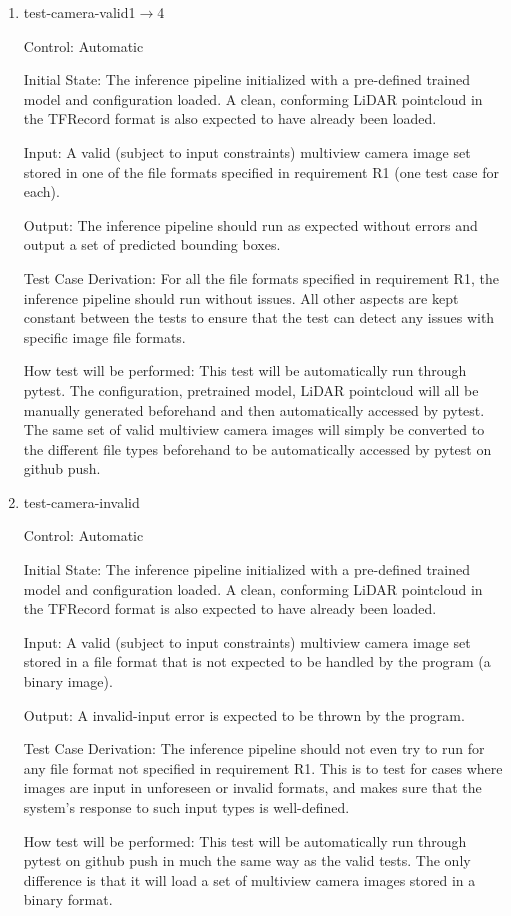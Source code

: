 \documentclass[12pt, titlepage]{article}
\begin{document}
\begin{enumerate}

\item{test-camera-valid1$\rightarrow$4\\}

Control: Automatic
					
Initial State: The inference pipeline initialized with a pre-defined trained model and configuration loaded. A clean, conforming LiDAR pointcloud in the TFRecord format
is also expected to have already been loaded.
					
Input: A valid (subject to input constraints) multiview camera image set stored in one of the file formats specified in requirement R1 (one test case for each).
					
Output: The inference pipeline should run as expected without errors and output a set of predicted bounding boxes.

Test Case Derivation: For all the file formats specified in requirement R1, the inference pipeline should run without issues. All other aspects are kept
constant between the tests to ensure that the test can detect any issues with specific image file formats.
					
How test will be performed: This test will be automatically run through pytest. The configuration, pretrained model, LiDAR pointcloud will all be manually generated beforehand
and then automatically accessed by pytest. The same set of valid multiview camera images will simply be converted to the different file types beforehand to be automatically accessed
by pytest on github push.
					
\item{test-camera-invalid\\}

Control: Automatic
					
Initial State: The inference pipeline initialized with a pre-defined trained model and configuration loaded. A clean, conforming LiDAR pointcloud in the TFRecord format
is also expected to have already been loaded.
					
Input: A valid (subject to input constraints) multiview camera image set stored in a file format that is not expected to be handled by the program (a binary image).
					
Output: A invalid-input error is expected to be thrown by the program.

Test Case Derivation: The inference pipeline should not even try to run for any file format not specified in requirement R1. This is to test for cases
where images are input in unforeseen or invalid formats, and makes sure that the system's response to such input types is well-defined. 

How test will be performed: This test will be automatically run through pytest on github push in much the same way as the valid tests. The only difference is that it will
load a set of multiview camera images stored in a binary format.

\end{enumerate}
\end{document}
